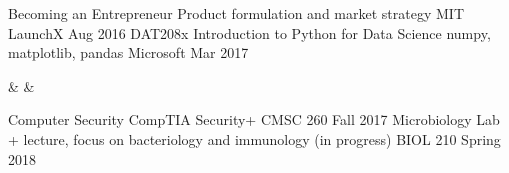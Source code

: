 

\begin{additionaleducation}
  \cvdateitem
    {Becoming an Entrepreneur} %
    {Product formulation and market strategy} %
    {MIT LaunchX} %
    {Aug 2016} %
   \cvdateitem
    {DAT208x Introduction to Python for Data Science} %
    {numpy, matplotlib, pandas} %
    {Microsoft} %
    {Mar 2017} %
\end{additionaleducation}





\begin{additionaleducation}
   &  &  \\
\end{additionaleducation}





\begin{additionaleducation}
  \cvdateitem
    {Computer Security} %
    {CompTIA Security+} %
    {CMSC 260} %
    {Fall 2017} %
   \cvdateitem
    {Microbiology} %
    {Lab + lecture, focus on bacteriology and immunology (in progress)} %
    {BIOL 210} %
    {Spring 2018} %
\end{additionaleducation}

